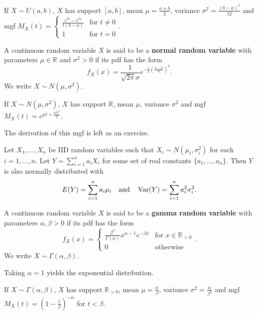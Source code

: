 If $X\sim U(a,b)$, $X$ has support $[a,b]$, mean $\mu=\frac{a+b}{2}$, variance $\sigma^2=\frac{(b-a)^2}{12}$ and mgf $M_X(t)=\begin{cases}
	\frac{e^{tb}-e^{ta}}{t(b-a)} & \text{for $t\neq 0$}\\
	1 & \text{for $t= 0$}
\end{cases}$.

\begin{definition}
	A continuous random variable $X$ is said to be a \textbf{normal random variable} with parameters $\mu\in\mathbb R$ and $\sigma^2>0$ if its pdf has the form
	$$f_X(x)=\frac{1}{\sqrt{2\pi}\sigma}e^{-\frac 12\left(\frac{x-\mu}{\sigma}\right)^2}.$$
	We write $X\sim N(\mu,\sigma^2)$.
\end{definition}

If $X\sim N(\mu,\sigma^2)$, $X$ has support $\mathbb R$, mean $\mu$, variance $\sigma^2$ and mgf $M_X(t)=e^{\mu t+\frac{\sigma^2 t^2}{2}}$.

The derivation of this mgf is left as an exercise.

\begin{theorem}[]
	Let $X_1,\hdots,X_n$ be IID random variables such that $X_i\sim N(\mu_i,\sigma_i^2)$ for each $i=1,\hdots,n$. Let $Y=\sum_{i=1}^na_iX_i$ for some set of real constants $\{a_1,\hdots,a_n\}$. Then $Y$ is also normally distributed with
$$E(Y)=\sum_{i=1}^na_i\mu_i\quad\text{and}\quad\operatorname{Var}(Y)=\sum_{i=1}^na_i^2\sigma_i^2.$$
\end{theorem}

\begin{definition}
	A continuous random variable $X$ is said to be a \textbf{gamma random variable} with parameters $\alpha,\beta>0$ if its pdf has the form
	$$f_X(x)=\begin{cases}
		\frac{\beta^\alpha}{\Gamma(\alpha)} x^{\alpha - 1} e^{-\beta x } & \text{for $x\in\mathbb R_{>0}$}\\
		0 & \text{otherwise}
	\end{cases}.$$
	We write $X\sim \Gamma(\alpha,\beta)$.
\end{definition}

Taking $\alpha=1$ yields the exponential distribution.

If $X\sim \Gamma(\alpha,\beta)$, $X$ has support $\mathbb R_{>0}$, mean $\mu=\frac{\alpha}{\beta}$, variance $\sigma^2=\frac{\alpha}{\beta^2}$ and mgf $M_X(t)=\left(1 - \frac{t}{\beta}\right)^{-\alpha}$ for $t < \beta$.


